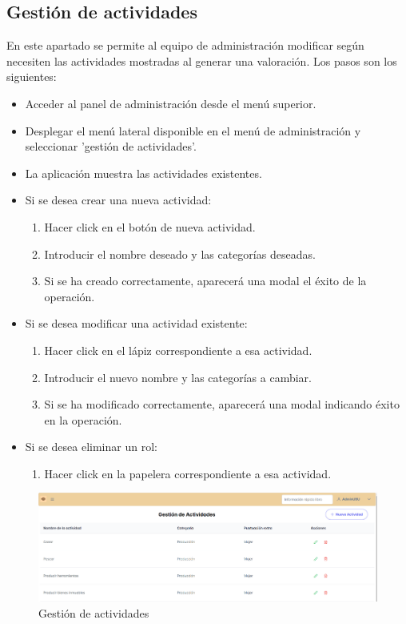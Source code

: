 \subsection{Gestión de actividades}
En este apartado se permite al equipo de administración modificar según necesiten las actividades mostradas al generar una valoración.
Los pasos son los siguientes:

\begin{itemize}
    \item Acceder al panel de administración desde el menú superior.
    \item Desplegar el menú lateral disponible en el menú de administración y seleccionar 'gestión de actividades'.
    \item La aplicación muestra las actividades existentes.
    \item Si se desea crear una nueva actividad:
    \begin{enumerate}
        \item Hacer click en el botón de nueva actividad.
        \item Introducir el nombre deseado y las categorías deseadas.
        \item Si se ha creado correctamente, aparecerá una modal el éxito de la operación.
    \end{enumerate}
    \item Si se desea modificar una actividad existente:
    \begin{enumerate}
        \item Hacer click en el lápiz correspondiente a esa actividad.
        \item Introducir el nuevo nombre y las categorías a cambiar.
        \item Si se ha modificado correctamente, aparecerá una modal indicando éxito en la operación.
    \end{enumerate}
    \item Si se desea eliminar un rol:
    \begin{enumerate}
        \item Hacer click en la papelera correspondiente a esa actividad.
    \end{enumerate}
\end{itemize}

\begin{figure}[h]
    \centering
    \includegraphics[width=1\linewidth]{Imagenes/ManualActividades.png}
    \caption{Gestión de actividades}
    \label{Gestión de actividades}
\end{figure}
\FloatBarrier

